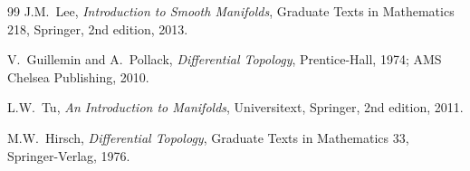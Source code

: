 \documentclass[12pt,a4paper,openany]{book}
\theoremstyle{definition}
\theoremstyle{remark}
\begin{document}
\begin{thebibliography}{99}
J.M.~Lee,
\textit{Introduction to Smooth Manifolds},
Graduate Texts in Mathematics 218,
Springer, 2nd edition, 2013.

V.~Guillemin and A.~Pollack,
\textit{Differential Topology},
Prentice-Hall, 1974; AMS Chelsea Publishing, 2010.

L.W.~Tu,
\textit{An Introduction to Manifolds},
Universitext, Springer, 2nd edition, 2011.

M.W.~Hirsch,
\textit{Differential Topology},
Graduate Texts in Mathematics 33,
Springer-Verlag, 1976.

\end{thebibliography}


\printindex
\end{document}
